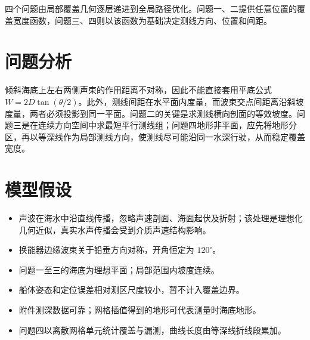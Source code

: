 \documentclass[withoutpreface,notoc]{cumcmthesis}
\begin{document}
四个问题由局部覆盖几何逐层递进到全局路径优化。问题一、二提供任意位置的覆盖宽度函数，问题三、四则以该函数为基础决定测线方向、位置和间距。

\section{问题分析}
倾斜海底上左右两侧声束的作用距离不对称，因此不能直接套用平底公式 $W=2D\tan(\theta/2)$。此外，测线间距在水平面内度量，而波束交点间距离沿斜坡度量，两者必须投影到同一平面。问题二的关键是求测线横向剖面的等效坡度。问题三是在连续方向空间中求最短平行测线组；问题四地形非平面，应先将地形分区，再以等深线作为局部测线方向，使测线尽可能沿同一水深行驶，从而稳定覆盖宽度。

\section{模型假设}
\begin{itemize}[itemindent=2em]
  \item 声波在海水中沿直线传播，忽略声速剖面、海面起伏及折射；该处理是理想化几何近似，真实水声传播会受到介质声速结构影响\cite{lurton}。
  \item 换能器边缘波束关于铅垂方向对称，开角恒定为 $120^\circ$。
  \item 问题一至三的海底为理想平面；局部范围内坡度连续。
  \item 船体姿态和定位误差相对测区尺度较小，暂不计入覆盖边界。
  \item 附件测深数据可靠；网格插值得到的地形可代表测量时海底地形。
  \item 问题四以离散网格单元统计覆盖与漏测，曲线长度由等深线折线段累加。
\end{itemize}
\end{document}
